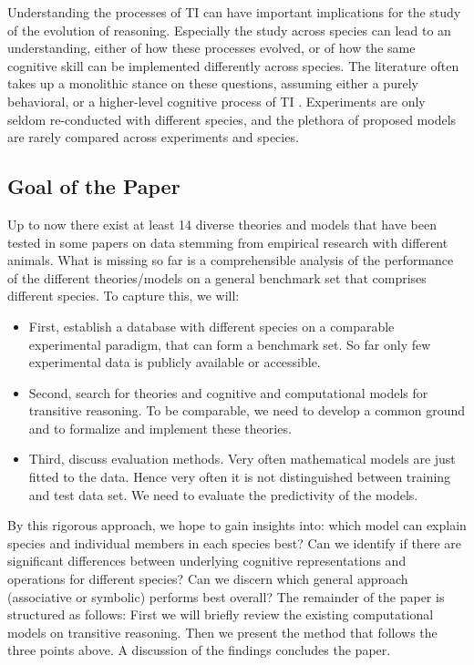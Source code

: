 \documentclass[10pt,letterpaper]{article}
\begin{document}
	Understanding the processes of TI can have important implications for the study of the evolution of reasoning.
	Especially the study across species can lead to an understanding, either of how these processes evolved, or of how the same cognitive skill can be implemented differently across species.
	The literature often takes up a monolithic stance on these questions, assuming either a purely behavioral, or a higher-level cognitive process of TI \cite<but, see>{jensen2015}.
	Experiments are only seldom re-conducted with different species, and the plethora of proposed models are rarely compared across experiments and species.
	
	\subsection{Goal of the Paper}
	Up to now there exist at least 14 diverse theories and models that have been tested in some papers on data stemming from empirical research with different animals. What is missing so far is a comprehensible analysis of the performance of the different theories/models on a general benchmark set that comprises different species. To capture this, we will:
	\begin{itemize}
		\setlength\itemsep{-.3em}
		\item First, establish a database with different species on a comparable experimental paradigm, that can form a benchmark set. So far only few experimental data is publicly available or accessible. %
		
		\item Second, search for theories and cognitive and computational models for transitive reasoning. To be comparable, we need to develop a common ground and to formalize and implement these theories.
		
		\item Third, discuss evaluation methods. Very often mathematical models are just fitted to the data. Hence very often it is not distinguished between training and test data set. We need to evaluate the predictivity of the models.  
	\end{itemize}
	
	By this rigorous approach, we hope to gain insights into: which model can explain species and individual members in each species best? Can we identify if there are significant differences between underlying cognitive representations and operations for different species? Can we discern which general approach (associative or symbolic) performs best overall?
	The remainder of the paper is structured as follows: First we will briefly review the existing computational models on transitive reasoning. Then we present the method that follows the three points above. A discussion of the findings concludes the paper.
\end{document}
